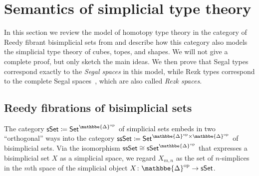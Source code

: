 \documentclass{amsart}
\theoremstyle{plain}
\theoremstyle{definition}
\theoremstyle{remark}
\numberwithin{equation}{section}
\newcommand{\defeq}{\coloneqq}
\newcommand{\univtype}{\mathcal{U}}
\newcommand{\Set}{\mathsf{Set}}
\newcommand{\sSet}{\mathsf{sSet}}
\newcommand{\ssSet}{\mathsf{ssSet}}
\newcommand{\DDelta}{\mathbbe{\Delta}}
\newcommand{\op}{\mathrm{op}}
\begin{document}



\appendix

\section{Semantics of simplicial type theory}
\label{sec:semantics}

In this section we review the model of homotopy type theory in the category of Reedy fibrant bisimplicial sets from \cite{elreedy} and describe how this category also models the simplicial type theory of cubes, topes, and shapes.
We will not give a complete proof, but only sketch the main ideas.
We then prove that Segal types correspond exactly to the \emph{Segal spaces} in this model, while Rezk types correspond to the complete Segal spaces~\cite{css}, which are also called \emph{Rezk spaces}.

\subsection{Reedy fibrations of bisimplicial sets}

The category $\sSet \defeq\Set^{\DDelta^\op}$ of simplicial sets embeds in two ``orthogonal'' ways into the category $\ssSet \defeq \Set^{\DDelta^\op \times \DDelta^\op}$ of bisimplicial sets. Via the isomorphism $\ssSet \cong \sSet^{\DDelta^\op}$ that expresses a bisimplicial set $X$ as a simplicial space, we regard $X_{m,n}$ as the set of $n$-simplices in the $m$th space of the simplicial object $X \colon \DDelta^\op \to \sSet$. 
\end{document}
